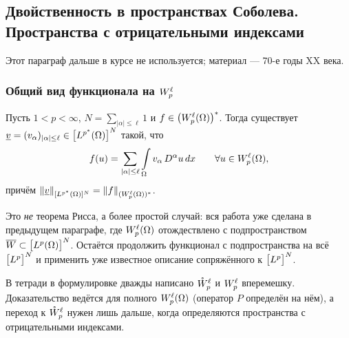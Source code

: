 \subsection{Двойственность в пространствах Соболева. Пространства с отрицательными индексами}

\begin{remark}[с лекции]
Этот параграф дальше в курсе не используется; материал — 70-е годы XX века.
\end{remark}

\subsubsection*{Общий вид функционала на $W_{p}^{\ell}$}

\begin{theorem}\label{thm:w-dual}
Пусть $1 < p < \infty$, $N = \sum_{|\alpha| \le \ell} 1$ и $f \in \big(W_{p}^{\ell}(\Omega)\big)^*$.
Тогда существует $\underline v = (v_\alpha)_{|\alpha| \le \ell} \in \big[L^{p^*}(\Omega)\big]^N$
такой, что
\[
  f(u) = \sum_{|\alpha| \le \ell} \int\limits_\Omega v_\alpha\, D^\alpha u\, dx
  \qquad \forall u \in W_{p}^{\ell}(\Omega) ,
\]
причём $\left\lVert \underline v \right\rVert_{[L^{p^*}(\Omega)]^N} = \left\lVert f \right\rVert_{(W_{p}^{\ell}(\Omega))^*}$.
\end{theorem}

\begin{idea}
Это \emph{не} теорема Рисса, а более простой случай: вся работа уже сделана в предыдущем
параграфе, где $W_{p}^{\ell}(\Omega)$ отождествлено с подпространством
$\overline{W} \subset \big[L^{p}(\Omega)\big]^N$. Остаётся продолжить функционал с
подпространства на всё $\big[L^{p}\big]^N$ и применить уже известное описание
сопряжённого к $\big[L^{p}\big]^N$.
\end{idea}

\begin{warn}
В тетради в формулировке дважды написано $\mathring{W}_{p}^{\ell}$ и $W_{p}^{\ell}$ вперемешку.
Доказательство ведётся для полного $W_{p}^{\ell}(\Omega)$ (оператор $P$ определён на нём),
а переход к $\mathring{W}_{p}^{\ell}$ нужен лишь дальше, когда определяются пространства
с отрицательными индексами.
\end{warn}

